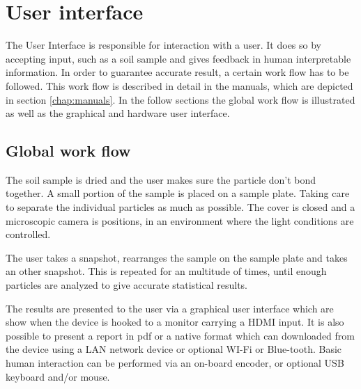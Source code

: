 \documentclass[11pt,fleqn,,a4paper,twoside,openright]{book}
\begin{document}
\chapter{User interface}\label{chap:UserInterface}
The User Interface is responsible for interaction with a user. It does so by accepting input, such as a soil sample and gives feedback in human interpretable information. In order to guarantee accurate result, a certain work flow has to be followed. This work flow is described in detail in the manuals, which are depicted in section \ref{chap:manuals}. In the follow sections the global work flow is illustrated as well as the graphical and hardware user interface.

\section{Global work flow}
The soil sample is dried and the user makes sure the particle don't bond together. A small portion of the sample is placed on a sample plate. Taking care to separate the individual particles as much as possible. The cover is closed and a microscopic camera is positions, in an environment where the light conditions are controlled.

The user takes a snapshot, rearranges the sample on the sample plate and takes an other snapshot. This is repeated for an multitude of times, until enough particles are analyzed to give accurate statistical results.

The results are presented to the user via a graphical user interface which are show when the device is hooked to a monitor carrying a HDMI input. It is also possible to present a report in pdf or a native format which can downloaded from the device using a LAN network device or optional WI-Fi or Blue-tooth. Basic human interaction can be performed via an on-board encoder, or optional USB keyboard and/or mouse.

\newpage
\end{document}
